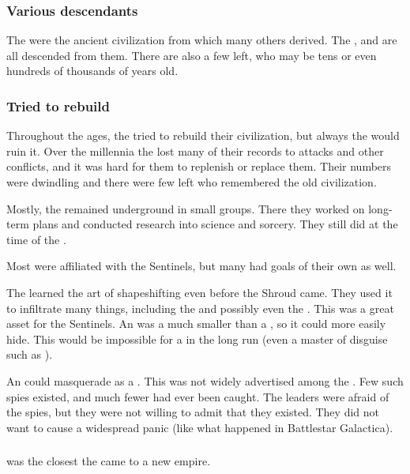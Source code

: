 \subsubsection{Various descendants}
The \ophidians{} were the ancient civilization from which many others derived. 
The \dragons, \quiljaaran{} and \nagae{} are all descended from them.
There are also a few  \ophidians{} left, who may be tens or even hundreds of thousands of years old. 





\subsubsection{Tried to rebuild}
Throughout the ages, the \ophidians tried to rebuild their civilization, but always the  would ruin it.
Over the millennia the \ophidians lost many of their records to \noggyal attacks and other conflicts, and it was hard for them to replenish or replace them.
Their numbers were dwindling and there were few left who remembered the old \ophidian civilization. 

Mostly, the \ophidians remained underground in small groups.
There they worked on long-term plans and conducted research into science and sorcery. 
They still did at the time of the \thirdbanewar. 

Most \ophidians were affiliated with the Sentinels, but many had goals of their own as well.

The \ophidians learned the art of shapeshifting even before the Shroud came. 
They used it to infiltrate many things, including the \aryothim and possibly even the \resphain. 
This was a great asset for the Sentinels. 
An \ophidian was a much smaller \vertex than a \dragon, so it could more easily hide.
This would be impossible for a \dragon in the long run (even a master of disguise such as \Nzessuacrith). 

An \ophidian could masquerade as a \bezed. 
This was not widely advertised among the \resphain.
Few such spies existed, and much fewer had ever been caught. 
The \resphan leaders were afraid of the spies, but they were not willing to admit that they existed.
They did not want to cause a widespread panic (like what happened in Battlestar Galactica).





\subsubsection{\Saphyrae}
 was the closest the \ophidians came to a new empire. 






